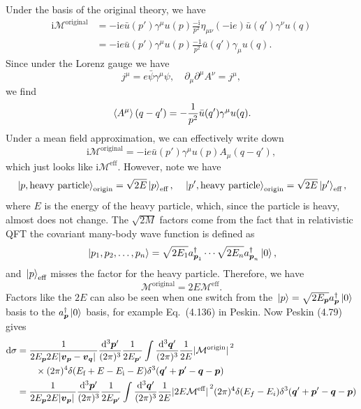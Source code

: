 \documentclass[hyperref, a4paper]{article}
\newcommand*{\ii}{\mathrm{i}}
\begin{document}
\begin{itemize}
Under the basis of the original theory, we have 
\[
    \begin{aligned}
        \ii \mathcal{M}^\text{original} &= - \ii e \bar{u}(p') \gamma^\mu u(p) \frac{- \ii}{p^2} \eta_{\mu \nu}
        (- \ii e) \bar{u}(q') \gamma^\nu u(q) \\
        &= - \ii e \bar{u}(p') \gamma^\mu u(p) \frac{- 1}{p^2} \bar{u}(q') \gamma_\mu u(q) .
    \end{aligned}
\]
Since under the Lorenz gauge we have 
\[
    j^\mu = e \bar{\psi} \gamma^\mu \psi, \quad \partial_\mu \partial^\mu A^\nu = j^\mu,
\]
we find 
\[
    \expval*{A^\mu}(q - q') = - \frac{1}{p^2} \bar{u}(q') \gamma^\mu u(q).
\]
Under a mean field approximation, we can effectively write down 
\[
    \ii \mathcal{M}^\text{original} = - \ii e \bar{u}(p') \gamma^\mu u(p) A_\mu(q-  q'),
\]
which just looks like $\ii \mathcal{M}^\text{eff}$. However, note we have 
\[
    \ket*{p, \text{heavy particle}}_\text{origin} = \sqrt{2 E} \ket*{p}_\text{eff}, \quad 
    \ket*{p', \text{heavy particle}}_\text{origin} = \sqrt{2 E} \ket*{p'}_\text{eff},
\]
where $E$ is the energy of the heavy particle, which, since the particle is heavy, almost does not change. 
The $\sqrt{2 M}$ factors come from the fact that in relativistic QFT the covariant many-body wave 
function is defined as 
\[
    \ket*{p_1, p_2, \ldots, p_n} = \sqrt{2 E_{1}} a^\dagger_{\vb*{p}_1} \cdots \sqrt{2 E_n} a^\dagger_{\vb*{p}_n} \ket*{0},
\]
and $\ket*{p}_\text{eff}$ misses the factor for the heavy particle. Therefore, we have
\begin{equation}
    \mathcal{M}^\text{original} = 2 E \mathcal{M}^\text{eff} .
\end{equation} 
Factors like the $2E$ can also be seen when one switch from the $\ket*{p} = \sqrt{2 E_{\vb*{p}}} 
a^\dagger_{\vb*{p}} \ket*{0}$ basis to the $a^\dagger_{\vb*{p}} \ket*{0}$ basis, for example Eq.~(4.136) in Peskin.
Now Peskin (4.79) gives 
\[
    \begin{aligned}
        \dd{\sigma} &= \frac{1}{2 E_{\vb*{p}} 2 E \abs*{\vb*{v}_{\vb*{p}} - \vb*{v}_{\vb*{q}}}} 
        \frac{\dd[3]{\vb*{p}'}}{(2\pi)^3} \frac{1}{2 E_{\vb*{p}'}} \int \frac{\dd[3]{\vb*{q}'}}{(2\pi)^3} \frac{1}{2E} \abs*{\mathcal{M}^\text{origin}}^2 \\
        &\quad \quad \times (2\pi)^4 \delta(E_\text{f} + E - E_\text{i} - E) \delta^3(\vb*{q}' + \vb*{p}' - \vb*{q} - \vb*{p})  \\
        &= \frac{1}{2 E_{\vb*{p}} 2 E \abs*{\vb*{v}_{\vb*{p}}} } 
        \frac{\dd[3]{\vb*{p}'}}{(2\pi)^3} \frac{1}{2 E_{\vb*{p}'}} \int \frac{\dd[3]{\vb*{q}'}}{(2\pi)^3} \frac{1}{2E} \abs*{2 E \mathcal{M}^\text{eff}}^2 (2\pi)^4 \delta(E_{f} - E_{i} ) \delta^3(\vb*{q}' + \vb*{p}' - \vb*{q} - \vb*{p}) \\

\end{aligned}\]
\end{itemize}
\end{document}

